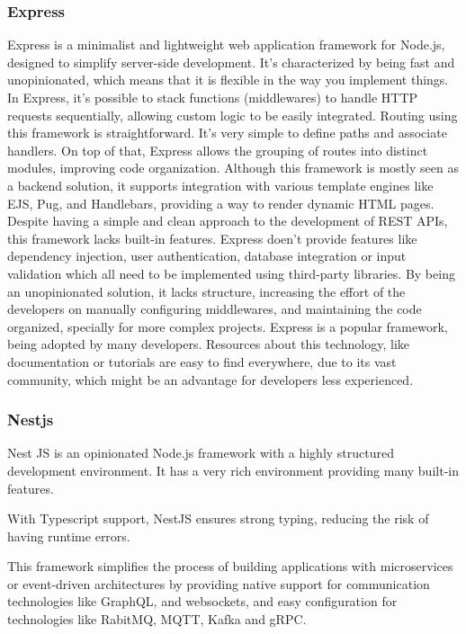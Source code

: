 \subsubsection{Express}
Express is a minimalist and lightweight web application framework for Node.js,
designed to simplify server-side development. It's characterized by being
fast and unopinionated, which means that it is flexible in the way you implement
things.
In Express, it's possible to stack functions (middlewares) to handle \gls{HTTP}
requests sequentially, allowing custom logic to be easily integrated.
Routing using this framework is straightforward. It's very simple to define
paths and associate handlers. On top of that, Express allows the grouping of
routes into distinct modules, improving code organization.
Although this framework is mostly seen as a backend solution, it supports
integration with various template engines like \gls{EJS}, Pug, and Handlebars,
providing a way to render dynamic \gls{HTML} pages.
Despite having a simple and clean approach to the development of \gls{REST} \gls{API}s,
this framework lacks built-in features. Express doen't provide features like
dependency injection, user authentication, database integration or input
validation which all need to be implemented using third-party libraries.
By being an unopinionated solution, it lacks structure, increasing the effort
of the developers on manually configuring middlewares, and maintaining the code
organized, specially for more complex projects.
Express is a popular framework, being adopted by many developers. Resources
about this technology, like documentation or tutorials are easy to find
everywhere, due to its vast community, which might be an advantage for
developers less experienced\cite{expressJSMDN}.

\subsubsection{Nestjs}
Nest JS is an opinionated Node.js framework with a highly structured
development environment. It has a very rich environment providing many built-in
features\cite{nestJS}.

With Typescript support, NestJS ensures strong typing, reducing the risk of
having runtime errors.

This framework simplifies the process of building applications with
microservices or event-driven architectures by providing native support for
communication technologies like GraphQL, and websockets, and easy configuration
for technologies like RabitMQ, \gls{MQTT}, Kafka and \gls{gRPC}\cite{nestJS}.

